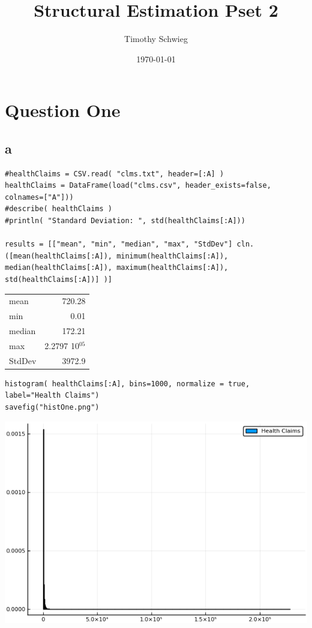 \documentclass[12pt, letterpaper]{paper}
\author{Timothy Schwieg}
\date{\today}
\title{Structural Estimation Pset 2}
\begin{document}
\maketitle

\section{Question One}
\label{sec:org2ded0c1}
\subsection{a}
\label{sec:org83aad7c}
\begin{verbatim}
#healthClaims = CSV.read( "clms.txt", header=[:A] )
healthClaims = DataFrame(load("clms.csv", header_exists=false, colnames=["A"]))
#describe( healthClaims )
#println( "Standard Deviation: ", std(healthClaims[:A]))

results = [["mean", "min", "median", "max", "StdDev"] cln.([mean(healthClaims[:A]), minimum(healthClaims[:A]), median(healthClaims[:A]), maximum(healthClaims[:A]), std(healthClaims[:A])] )]
\end{verbatim}

\begin{center}
\begin{tabular}{lr}
mean & 720.28\\
min & 0.01\\
median & 172.21\\
max & 2.2797 \texttimes{} 10\(^{\text{05}}\)\\
StdDev & 3972.9\\
\end{tabular}
\end{center}

\begin{verbatim}
histogram( healthClaims[:A], bins=1000, normalize = true, label="Health Claims")
savefig("histOne.png")
\end{verbatim}

\begin{center}
\includegraphics[width=.9\linewidth]{histOne.png}
\end{center}
\end{document}
